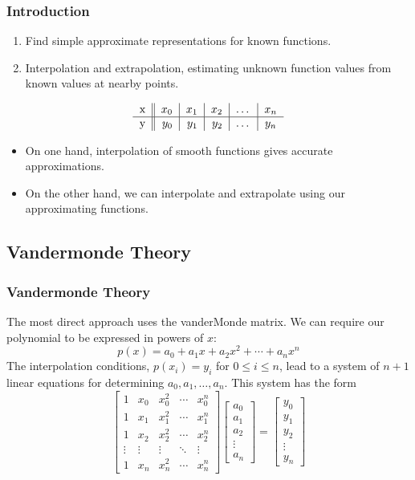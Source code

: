 \documentclass[notheorems,mathserif,table,compress]{beamer}  %
\begin{document}
\begin{frame}
  \frametitle{Introduction}
  \begin{enumerate}
  \item Find simple approximate representations for known functions.
  \item Interpolation and extrapolation, estimating unknown function values from known values at nearby points.
  \end{enumerate}
  \begin{displaymath}
  \begin{tabular}{r|| r| r| r| c| c}
  x & $x_0$ & $x_1$ & $x_2$ & \ldots & $x_n$\\
  \hline
  y & $y_0$ & $y_1$ & $y_2$ & \ldots & $y_n$
  \end{tabular}
  \end{displaymath}
  \begin{itemize}
  \item On one hand, interpolation of smooth functions gives accurate approximations. 
  \item On the other hand, we can interpolate and extrapolate using our approximating functions.
  \end{itemize}
\end{frame}


\subsection{Vandermonde Theory}


\begin{frame}
  \frametitle{Vandermonde Theory}
  The most direct approach uses the vanderMonde matrix. We can require our polynomial to be expressed in powers of $x$:
  \[ p(x)=a_0+a_1x+a_2x^2+\cdots+a_nx^n \]
  The interpolation conditions, $p(x_i)=y_i$ for $0\le i\le n$, lead to a system of $n+1$ linear equations for determining $a_0,a_1,\ldots,a_n$. This system has the form
  \begin{displaymath}
  \begin{bmatrix}
     1    &   x_0   & x_0^2  & \cdots & x_0^n  \\
     1    &   x_1   & x_1^2  & \cdots & x_1^n  \\
     1    &   x_2   & x_2^2  & \cdots & x_2^n  \\
  \vdots  & \vdots  & \vdots & \ddots & \vdots \\
     1    &   x_n   & x_n^2  & \cdots & x_n^n
  \end{bmatrix}
  \begin{bmatrix}
  a_0    \\
  a_1    \\
  a_2    \\
  \vdots \\
  a_n
  \end{bmatrix}
  =\begin{bmatrix}
  y_0    \\
  y_1    \\
  y_2    \\
  \vdots \\
  y_n
  \end{bmatrix}
  \end{displaymath}
\end{frame}
\end{document}
